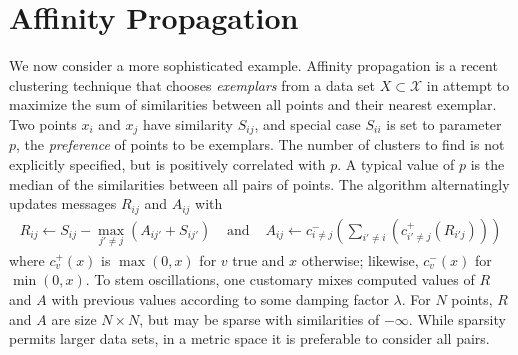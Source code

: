 \documentclass{article}
\newtheorem{definition} {Definition}
\newcommand{\killspace}{\vspace{-0.08in}}
\newcommand{\mysection}[1]{\vspace{-0.04in}\section{#1}\killspace}
\newcommand{\ocpos}[1]{c^{+}_{#1}}
\newcommand{\ocneg}[1]{c^{-}_{#1}}
\newcommand{\cpos}[2]{\ocpos{#1 \neq #2}}
\newcommand{\cneg}[2]{\ocneg{#1 \neq #2}}
\newcommand{\respo}[2]{R_{#1#2}}
\newcommand{\avail}[2]{A_{#1#2}}
\newcommand{\simil}[2]{S_{#1#2}}
\begin{document}



%


\mysection{Affinity Propagation}


We now consider a more sophisticated example.
Affinity propagation \cite{affinity} is a recent clustering technique
that chooses {\em exemplars} from a data set $X \subset \mathcal{X}$
in attempt to maximize the sum of similarities between all points and
their nearest exemplar.  Two points $x_i$ and $x_j$ have similarity
$\simil{i}{j}$, and special case $\simil{i}{i}$ is set to parameter
$p$, the {\em preference} of points to be exemplars.  The number of
clusters to find is not explicitly specified, but is positively
correlated with $p$.  A typical value of $p$ is the median of the
similarities between all pairs of points.
The algorithm alternatingly updates messages $\respo{i}{j}$ and
$\avail{i}{j}$ with
\[ \begin{array}{rcl}
  \respo{i}{j} \gets \simil{i}{j} - \max_{j' \neq j} (\avail{i}{j'} + \simil{i}{j'})
  & \text{ and } &
  \avail{i}{j} \gets \cneg{i}{j}( \sum_{i' \neq i} ( \cpos{i'}{j}(\respo{i'}{j}) ) )
\end{array} \]
where $\ocpos{v}(x)$ is $\max(0,x)$ for $v$ true and $x$ otherwise;
likewise, $\ocneg{v}(x)$ for $\min(0,x)$.
To stem oscillations, one customary mixes computed values of $R$ and $A$ with previous values according to some damping factor $\lambda$.
For $N$ points, $R$ and $A$ are size $N \times N$, but may be sparse with similarities of $-\infty$.
While sparsity permits larger data sets, in a metric space it is preferable to consider all pairs.
\end{document}
